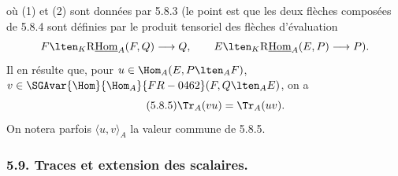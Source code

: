 où (1) et (2) sont données par 5.8.3 (le point est que les deux flèches composées de 5.8.4 sont définies par le produit tensoriel des flèches d'évaluation
\[
F\lten_K\mathrm{R}\underline{\mathrm{Hom}}_A(F,Q)\longrightarrow Q,\qquad
E\lten_K\mathrm{R}\underline{\mathrm{Hom}}_A(E,P)\longrightarrow P).
\]
Il en résulte que, pour $u\in\Hom_A(E,P\lten_AF)$, $v\in\SGAvar{\Hom}{\Hom_A}{FR-0462}(F,Q\lten_AE)$, on a
\begin{equation}\tag{5.8.5}
\Tr_A(vu)=\Tr_A(uv).
\end{equation}
On notera parfois $\langle u,v\rangle_A$ la valeur commune de 5.8.5.

\subsubsection*{5.9. Traces et extension des scalaires.}

